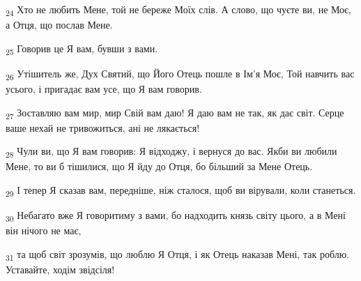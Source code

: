 \begin{tcolorbox}
\textsubscript{24} Хто не любить Мене, той не береже Моїх слів. А слово, що чуєте ви, не Моє, а Отця, що послав Мене.
\end{tcolorbox}
\begin{tcolorbox}
\textsubscript{25} Говорив це Я вам, бувши з вами.
\end{tcolorbox}
\begin{tcolorbox}
\textsubscript{26} Утішитель же, Дух Святий, що Його Отець пошле в Ім'я Моє, Той навчить вас усього, і пригадає вам усе, що Я вам говорив.
\end{tcolorbox}
\begin{tcolorbox}
\textsubscript{27} Зоставляю вам мир, мир Свій вам даю! Я даю вам не так, як дає світ. Серце ваше нехай не тривожиться, ані не лякається!
\end{tcolorbox}
\begin{tcolorbox}
\textsubscript{28} Чули ви, що Я вам говорив: Я відходжу, і вернуся до вас. Якби ви любили Мене, то ви б тішилися, що Я йду до Отця, бо більший за Мене Отець.
\end{tcolorbox}
\begin{tcolorbox}
\textsubscript{29} І тепер Я сказав вам, передніше, ніж сталося, щоб ви вірували, коли станеться.
\end{tcolorbox}
\begin{tcolorbox}
\textsubscript{30} Небагато вже Я говоритиму з вами, бо надходить князь світу цього, а в Мені він нічого не має,
\end{tcolorbox}
\begin{tcolorbox}
\textsubscript{31} та щоб світ зрозумів, що люблю Я Отця, і як Отець наказав Мені, так роблю. Уставайте, ходім звідсіля!
\end{tcolorbox}
